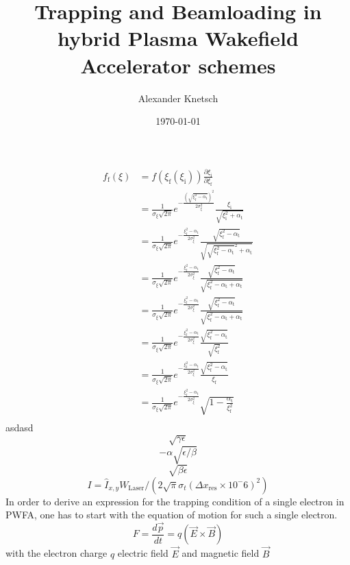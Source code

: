 \documentclass{thesis}
\title{Trapping and Beamloading in hybrid Plasma Wakefield Accelerator schemes}
\author{Alexander Knetsch}
\date{\today}
\begin{document}
\maketitle
\tableofcontents

\begin{align}
f_\mathrm{f}(\xi)&=f(\xi_\mathrm{f}(\xi_\mathrm{i}))\frac{\partial \xi_\mathrm{i}}{\partial \xi_\mathrm{f}}\\
&=\frac{1}{\sigma_\xi \sqrt{2\pi}}e^{-\frac{(\sqrt{\xi_\mathrm{f}^2-\alpha_\mathrm{t}})^2}{2\sigma_\xi^2}} \frac{\xi_\mathrm{i}}{\sqrt{\xi_\mathrm{i}^2+\alpha_\mathrm{t}}}\\
&=\frac{1}{\sigma_\xi \sqrt{2\pi}}e^{-\frac{\xi_\mathrm{f}^2-\alpha_\mathrm{t}}{2\sigma_\xi^2}} \frac{\sqrt{\xi_\mathrm{f}^2-\alpha_\mathrm{t}}}{\sqrt{\sqrt{\xi_\mathrm{f}^2-\alpha_\mathrm{t}}^2+\alpha_\mathrm{t}}}\\
&=\frac{1}{\sigma_\xi \sqrt{2\pi}}e^{-\frac{\xi_\mathrm{f}^2-\alpha_\mathrm{t}}{2\sigma_\xi^2}} \frac{\sqrt{\xi_\mathrm{f}^2-\alpha_\mathrm{t}}}{\sqrt{\xi_\mathrm{f}^2-\alpha_\mathrm{t}+\alpha_\mathrm{t}}}\\
&=\frac{1}{\sigma_\xi \sqrt{2\pi}}e^{-\frac{\xi_\mathrm{f}^2-\alpha_\mathrm{t}}{2\sigma_\xi^2}} \frac{\sqrt{\xi_\mathrm{f}^2-\alpha_\mathrm{t}}}{\sqrt{\xi_\mathrm{f}^2-\alpha_\mathrm{t}+\alpha_\mathrm{t}}}\\
&=\frac{1}{\sigma_\xi \sqrt{2\pi}}e^{-\frac{\xi_\mathrm{f}^2-\alpha_\mathrm{t}}{2\sigma_\xi^2}} \frac{\sqrt{\xi_\mathrm{f}^2-\alpha_\mathrm{t}}}{\sqrt{\xi_\mathrm{f}^2}}\\
&=\frac{1}{\sigma_\xi \sqrt{2\pi}}e^{-\frac{\xi_\mathrm{f}^2-\alpha_\mathrm{t}}{2\sigma_\xi^2}} \frac{\sqrt{\xi_\mathrm{f}^2-\alpha_\mathrm{t}}}{\xi_\mathrm{f}}\\
\label{eqn:Trapping_Response_function}
&=\frac{1}{\sigma_\xi \sqrt{2\pi}}e^{-\frac{\xi_\mathrm{f}^2-\alpha_\mathrm{t}}{2\sigma_\xi^2}} 
\sqrt{1-\frac{\alpha_\mathrm{t}}{\xi_\mathrm{f}^2}}\\
\end{align} 
asdasd
$$\sqrt{\gamma \epsilon}$$
$$-\alpha \sqrt{\epsilon/\beta}$$
$$\sqrt{\beta\epsilon}$$
$$I=\hat{I}_{x,y}W_\mathrm{Laser}/(2\sqrt{\pi}\sigma_t(\Delta x_\mathrm{res}\times10^-6)^2)$$
In order to derive an expression for the trapping condition of a single electron in PWFA, one has to start with the equation of motion for such a single electron. 
\begin{equation}
F=\frac{d\vec{p}}{dt}=q(\vec{E}\times \vec{B})
\end{equation}
with the electron charge $q$ electric field $\vec{E}$ and magnetic field $\vec{B}$
\end{document}
